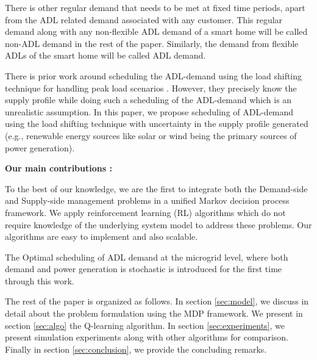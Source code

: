 There is other regular demand that needs to be met at fixed time periods, apart from the ADL related demand associated with any customer. This regular demand along with any non-flexible ADL demand of a smart home will be called non-ADL demand in the rest of the paper. Similarly, the demand from flexible ADLs of the smart home will be called ADL demand.

There is prior work around scheduling the ADL-demand using the load shifting technique for handling  peak load scenarios \cite{CL2014}. However, they precisely know the supply profile while doing such a scheduling of the ADL-demand which is an unrealistic assumption. In this paper, we propose scheduling of ADL-demand using the load shifting technique with uncertainty in the supply profile generated (e.g., renewable energy sources like solar or wind being the primary sources of power generation).


\textbf{Our main contributions :}\\
\begin{inparaenum}[\bfseries (i)]
\item To the best of our knowledge, we are the first  to integrate both the Demand-side and Supply-side management problems  in a unified Markov decision process framework. We apply reinforcement learning (RL) algorithms which do not require knowledge of the underlying system model to address these problems. Our algorithms are easy to implement and also scalable.\\
\item The Optimal scheduling of ADL demand at the microgrid level, where both  demand and power generation is stochastic is  introduced for the first time through this work. \\    
\end{inparaenum}
The rest of the paper is organized as follows. In section \ref{sec:model}, we discuss in detail about the problem formulation using the MDP framework. We present  in section \ref{sec:algo} the Q-learning algorithm. In section \ref{sec:experiments}, we present simulation experiments along with other algorithms for comparison. Finally in section \ref{sec:conclusion}, we provide the concluding remarks.
